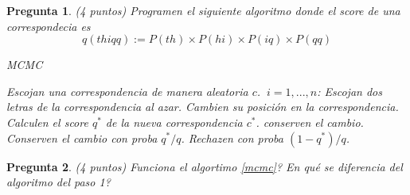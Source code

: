 \documentclass{article}
\newtheorem{pregunta}{Pregunta}
\begin{document}
\begin{pregunta} (4 puntos)
  Programen el siguiente algoritmo donde el score de una correspondecia es
  \begin{equation}
    q(thiqq) := P(th) \times P(hi) \times P(iq) \times P(qq)
  \end{equation}

\begin{algorithm}
\caption{MCMC}\label{mcmc}
\begin{algorithmic}[1]
\State Escojan una correspondencia de manera aleatoria $c$.
\For $ ~ i = 1, ..., n$:
\State Escojan dos letras de la correspondencia al azar.
\State Cambien su posici\'on en la correspondencia.
\State Calculen el score $q^*$ de la nueva correspondencia $c^*$.
 conserven el cambio.
\EndIf
{}
\State Conserven el cambio con proba $q^*/q$.
\State Rechazen con proba $(1-q^*)/q$.
\EndIf
\EndFor
\EndProcedure
\end{algorithmic}
\end{algorithm}

\end{pregunta}

\begin{pregunta} (4 puntos)
Funciona el algortimo \ref{mcmc}? En qu\'e se diferencia del algoritmo del paso 1?
\end{pregunta}
\end{document}
